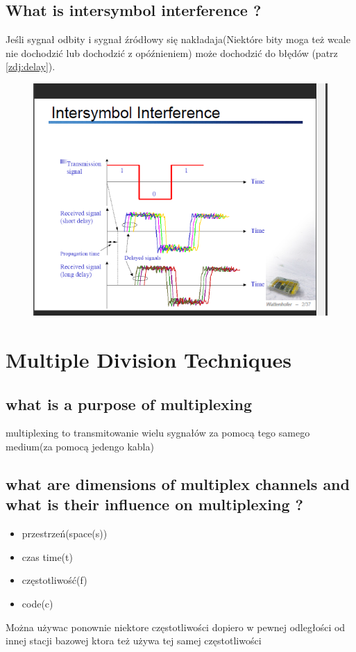 \subsection{What is intersymbol interference ?}
Jeśli sygnał odbity i sygnał źródłowy się nakładaja(Niektóre bity moga też wcale nie dochodzić lub dochodzić  z opóźnieniem) może dochodzić do błędów (patrz \ref{zdj:delay}). 
\begin{figure}

\caption{}
\label{zdj:}
\centering
\includegraphics[width=\textwidth]{zdjecia/intersymbol}
\end{figure}
\section{Multiple Division Techniques}
\subsection{what is a purpose of multiplexing}

multiplexing to transmitowanie wielu sygnałów za pomocą tego samego medium(za pomocą jedengo kabla)
\subsection{what are dimensions of multiplex channels and what is their influence on multiplexing ?}
\begin{itemize}
\item przestrzeń(space(s))
\item czas time(t)
\item częstotliwość(f)
\item code(c)
\end{itemize}
Można używac ponownie niektore częstotliwości dopiero w pewnej odległości od innej stacji bazowej ktora też używa tej samej częstotliwości

